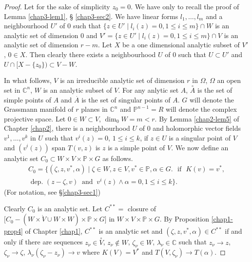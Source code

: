 \begin{proof} %
  Let  for the sake of simplicity $z_0=0$. We  have  only  to
  recall  the proof  of Lemma \ref{chap3-lem1}, \S
  \ref{chap3-sec2}. We  have  linear forms  $l_1, 
  \ldots , l_m$ and  a neighbourhood $U'$ of $0$ such  that $\{ z
  \in U' \mid l_i(z)=0,1 \leq i \leq m \}\cap W$ is an
  analytic  set of dimension  $0$ and $V' = \{z \in
  U' \mid l_i (z)=0,1 \leq i \leq m \} \cap V$ is an
  analytic set of dimension $r-m$. Let  $X$ be a one dimensional
  analytic  subset of $V'$, $0 \in X$. Then  clearly there  exists a
  neighbourhood $U$ of $0$ such that $U\subset U'$ and $U\cap
  [X-\{z_0\}) \subset V-W$.  

In what  follows, $V$  is an  irreducible  analytic set  of dimension
$r$ in  $\Omega$, $\Omega$ an open  set in  $\mathbb{C}^n$, $W$ is an
analytic  subset  of $V$. For any anlytic  set
$A$, $\overset{\circ}{A}$ is the  set of simple points of $A$  and
$\overset{.}{A}$ is the  set  of singular points of $A$. $G$ will  denote  the
Grassmann  manifold of $r$ planes  in   $\mathbb{C}^n$ and
$\mathbb{P}^{n-1}=R$  will  denote  the complex  projective  space. Let
$0 \in W  \subset V$, ${\dim}_0 W=m < r$. By Lemma  \ref{chap2-lem5} of Chapter
\ref{chap2}, there is a neighbourhood $U$ of $0$ and  holomorphic vector
fields $v^1,\ldots,v^k$ in  $U$ such  that $v^i(z)= 0$, $1 \leq i \leq
k$, if $z \in U$ is a singular point of $V$ and $(v^i(z))$ span
$T(v,z)$ is  $z$ is a simple point of $V$. We  now define  an analytic set
$C_0 \subset W \times  V \times \mathbb{P}\times G$ as follows. 
\begin{multline*}
  C_0 =\bigg\{(\zeta,z,v^*,\alpha)\mid \zeta \in W,z \in V,v^*
  \in \mathbb{P}, \alpha \in G. \text{~ if~ }  K(v)=v^*,\\
  \text{ dep. } (z-\zeta, v) ~\text{ and }~  v^i(z) \wedge \alpha =0, 1
  \leq i \leq k \bigg\}. 
\end{multline*}\pageoriginale
(For notation, see \S \ref{chap3-sec1})

Clearly $C_0$ is an analytic set. Let $C^{\ast\ast}=$ closure  of
$\bigg[C_0-(W \times \dot{V} \cup W \times W)\times
  \mathbb{P}\times G \bigg]$ in $W \times V \times \mathbb{P} \times
G$. By Proposition \ref{chap1-prop4} of Chapter \ref{chap1},
$C^{\ast\ast}$ is an analytic set 
and $(\zeta, z,v^\ast,\alpha)\in C^{\ast\ast}$ if and  only if
there  are sequences $z_\nu \in \overset{\circ}{V}$, $z_\nu \notin W$,
$\zeta_\nu \in W$, $\lambda_\nu \in\mathbb{C}$ such that  $z_\nu \to z$,
$\zeta_\nu \to \zeta$, $\lambda_\nu(\zeta_\nu-z_\nu)\to v$
where  $K(V)=V^\ast$ and $T(V, \zeta_\nu)\to T(\alpha)$. 


\end{proof}

